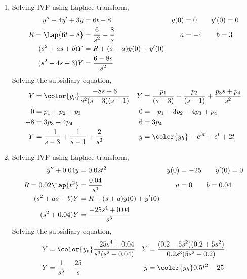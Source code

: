 \begin{enumerate}
    \item Solving IVP using Laplace transform,
          \begin{align}
              y'' - 4y' + 3y   & = 6t - 8                      &
              y(0)             & = 0 \qquad y'(0) = 0            \\
              R = \Lap\{6t-8\} & = \frac{6}{s^2} - \frac{8}{s} &
              a                & = -4 \qquad b = 3               \\
              (s^2 + as + b)Y  & = R + (s+a)y(0) + y'(0)         \\
              (s^2 - 4s + 3)Y  & = \frac{6 - 8s}{s^2}
          \end{align}
          Solving the subsidiary equation,
          \begin{align}
              Y               & = \color{y_p}\frac{-8s+6}
              {s^2(s-3)(s-1)} &
              Y               & = \frac{p_1}{(s-3)} + \frac{p_2}{(s-1)}
              + \frac{p_3 s + p_4}{s^2}                                   \\
              0               & = p_1 + p_2 + p_3                       &
              0               & = -p_1 - 3p_2 - 4p_3 + p_4                \\
              -8              & = 3p_3 - 4p_4                           &
              6               & = 3p_4                                    \\
              Y               & = \frac{-1}{s-3} + \frac{1}{s-1}
              + \frac{2}{s^2} &
              y               & = \color{y_h} -e^{3t} + e^{t} + 2t
          \end{align}

    \item Solving IVP using Laplace transform,
          \begin{align}
              y'' + 0.04y         & = 0.02t^2                   &
              y(0)                & = -25 \qquad y'(0) = 0        \\
              R = 0.02\Lap\{t^2\} & = \frac{0.04}{s^3}          &
              a                   & = 0 \qquad b = 0.04           \\
              (s^2 + as + b)Y     & = R + (s+a)y(0) + y'(0)       \\
              (s^2 + 0.04)Y       & = \frac{-25s^4 + 0.04}{s^3}
          \end{align}
          Solving the subsidiary equation,
          \begin{align}
              Y                 & = \color{y_p}\frac{-25s^4 + 0.04}
              {s^3(s^2 + 0.04)} &
              Y                 & = \frac{(0.2 - 5s^2)(0.2 + 5s^2)}
              {0.2s^3(5s^2 + 0.2)}                                    \\
              Y                 & = \frac{1}{s^3} - \frac{25}{s}    &
              y                 & = \color{y_h} 0.5t^2 - 25
          \end{align}


\end{enumerate}
